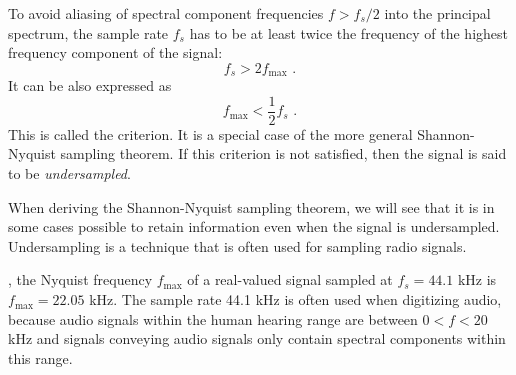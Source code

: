 To avoid aliasing of spectral component frequencies $f>f_s/2$ into the principal spectrum, the sample rate $f_s$ has to be at 
least twice the frequency of the highest frequency component of the signal:
\begin{equation}
  \boxed{
    f_s > 2f_{\mathrm{max}}
    }\,\,.
\end{equation}
It can be also expressed as 
\begin{equation}
  \boxed{
    f_{\mathrm{max}}<\frac{1}{2}f_s
    }\,\,.
\end{equation}
This is called the \emph{} criterion. It is a special case of the more general Shannon-Nyquist sampling theorem. 
If this criterion is not satisfied, then the signal is said to be \emph{undersampled}.

When deriving the Shannon-Nyquist sampling theorem, we will see that it is in some cases possible to retain information even when the signal is undersampled. Undersampling is a technique that is often used for sampling radio signals.

, the Nyquist frequency $f_{\mathrm{max}}$ of a real-valued signal sampled at $f_s=44.1$ kHz is $f_{\mathrm{max}}=22.05$ kHz. The sample rate 44.1 kHz is often used when digitizing audio, because audio signals within the human hearing range are between $0<f<20$ kHz and signals conveying audio signals only contain spectral components within this range.

